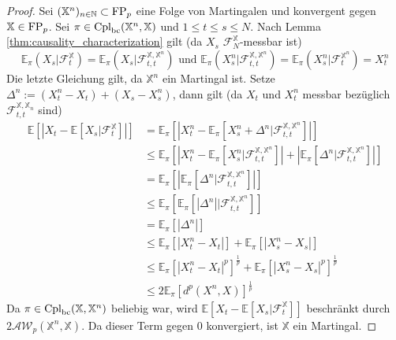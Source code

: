 \begin{proof}
    Sei $(\mathbb{X}^n)_{n\in\mathbb{N}} \subset \operatorname{FP}_p$ eine Folge von Martingalen und konvergent gegen $\mathbb{X} \in \operatorname{FP}_p$. Sei $\pi \in \operatorname{Cpl}_{\operatorname{bc}}(\mathbb{X}^n, \mathbb{X})$ und $1\leq t\leq s \leq N$. 
    Nach Lemma \ref{thm:causality_characterization} gilt (da $X_s$ $\mathcal{F}_N^\mathbb{X}$-messbar ist)
    $$\mathbb{E}_\pi(X_s \vert \mathcal{F}_t^\mathbb{X}) = \mathbb{E}_\pi(X_s \vert \mathcal{F}_{t,t}^{\mathbb{X}, \mathbb{X}^n}) \text{ und } \mathbb{E}_\pi(X_s^n \vert \mathcal{F}_{t,t}^{\mathbb{X}, \mathbb{X}^n}) = \mathbb{E}_\pi(X_s^n \vert \mathcal{F}_t^{\mathbb{X}^n}) = X_t^n $$
    Die letzte Gleichung gilt, da $\mathbb{X}^n$ ein Martingal ist. Setze $\Delta^n := (X_t^n - X_t) + (X_s - X_s^n)$, dann gilt (da $X_t$ und $X_t^n$ messbar bezüglich $\mathcal{F}_{t,t}^{\mathbb{X}, \mathbb{X}_n}$ sind)
    \begin{align*}
        \mathbb{E}\left[ \left|X_t - \mathbb{E}[X_s \vert \mathcal{F}_t^\mathbb{X}] \right|\right] &= \mathbb{E}_\pi\left[\left|X_t^n - \mathbb{E}_\pi\left[ X_s^n+ \Delta^n \vert \mathcal{F}_{t,t}^{\mathbb{X}, \mathbb{X}^n}\right] \right| \right] \\
        &\leq \mathbb{E}_\pi\left[\left|X_t^n - \mathbb{E}_\pi\left[ X_s^n\vert \mathcal{F}_{t,t}^{\mathbb{X}, \mathbb{X}^n}\right] \right| + \left|\mathbb{E}_\pi\left[ \Delta^n \vert \mathcal{F}_{t,t}^{\mathbb{X}, \mathbb{X}^n}\right] \right|\right] \\
        &= \mathbb{E}_\pi\left[\left|\mathbb{E}_\pi\left[ \Delta^n \vert \mathcal{F}_{t,t}^{\mathbb{X}, \mathbb{X}^n}\right] \right| \right] \\
        &\leq \mathbb{E}_\pi \left[ \mathbb{E}_\pi \left[ \left| \Delta^n\right| \vert \mathcal{F}_{t,t}^{\mathbb{X}, \mathbb{X}^n}\right]\right] \\
        &= \mathbb{E}_\pi\left[ \left| \Delta^n\right| \right] \\
        &\leq \mathbb{E}_\pi\left[\left| X_t^n - X_t \right|\right] + \mathbb{E}_\pi\left[\left| X_s^n - X_s \right|\right] \\
        &\leq \mathbb{E}_\pi\left[|X_t^n - X_t|^p \right]^{\frac{1}{p}} + \mathbb{E}_\pi\left[|X_s^n - X_s|^p \right]^{\frac{1}{p}} \\
        &\leq 2\mathbb{E}_\pi \left[ d^p(X^n, X) \right]^\frac{1}{p}
    \end{align*}
    Da $\pi \in \operatorname{Cpl}_{\operatorname{bc}}(\mathbb{X}, \mathbb{X}^n)$ beliebig war, wird $\mathbb{E}\left[X_t - \mathbb{E}[X_s \vert \mathcal{F}_t^\mathbb{X}] \right]$ beschränkt durch \\ $2\mathcal{AW}_p(\mathbb{X}^n, \mathbb{X})$. Da dieser Term gegen $0$ konvergiert, ist $\mathbb{X}$ ein Martingal. 
\end{proof}
